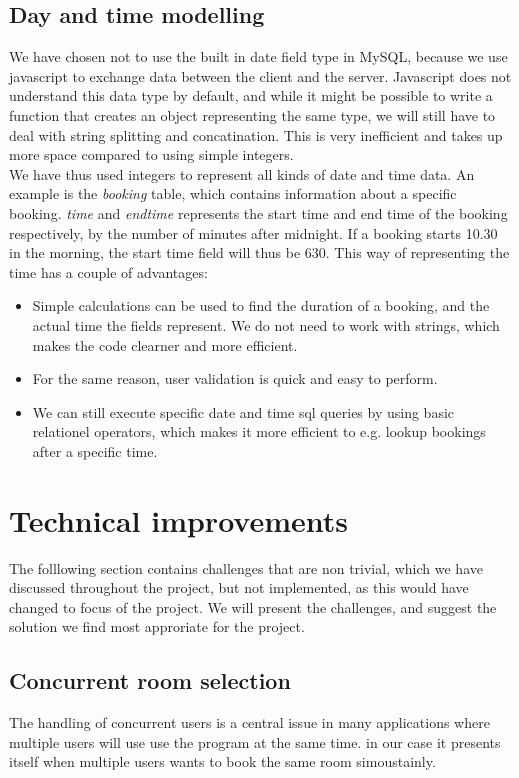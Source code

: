 \subsection{Day and time modelling}
\label{sub:day_and_time_modelling}
We have chosen not to use the built in date field type in MySQL, because we use javascript to exchange data between the client and the server. Javascript does not understand this data type by default, and while it might be possible to write a function that creates an object representing the same type, we will still have to deal with string splitting and concatination. This is very inefficient and takes up more space compared to using simple integers.\\
We have thus used integers to represent all kinds of date and time data. An example is the \emph{booking} table, which contains information about a specific booking. \emph{time} and \emph{endtime} represents the start time and end time of the booking respectively, by the number of minutes after midnight. If a booking starts 10.30 in the morning, the start time field will thus be 630. This way of representing the time has a couple of advantages:

\begin{itemize}
	\item Simple calculations can be used to find the duration of a booking, and the actual time the fields represent. We do not need to work with strings, which makes the code clearner and more efficient.
	\item For the same reason, user validation is quick and easy to perform.
	\item We can still execute specific date and time sql queries by using basic relationel operators, which makes it more efficient to e.g. lookup bookings after a specific time.
\end{itemize}

\section{Technical improvements}
\label{sec:challenges}
The folllowing section contains challenges that are non trivial, which we have discussed throughout the project, but not implemented, as this would have changed to focus of the project. We will present the challenges, and suggest the solution we find most approriate for the project.
\subsection{Concurrent room selection}
\label{sub:challenges_concurrent_rooms}
The handling of concurrent users is a central issue in many applications where multiple users will use use the program at the same time. in our case it presents itself when multiple users wants to book the same room simoustainly.


